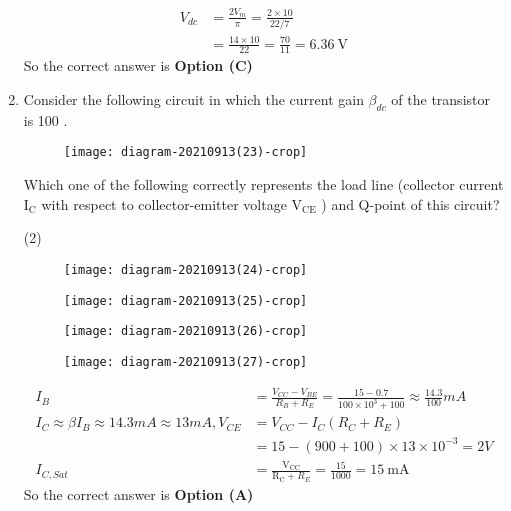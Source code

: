 \begin{enumerate}
\begin{answer}
\begin{align*}
V_{d c}&=\frac{2 V_{m}}{\pi}=\frac{2 \times 10}{22 / 7}\\&=\frac{14 \times 10}{22}=\frac{70}{11}=6.36 \mathrm{~V}
\end{align*}
So the correct answer is \textbf{Option (C)}
\end{answer}
	\item Consider the following circuit in which the current gain $\beta_{d c}$ of the transistor is 100 .\\
	\begin{figure}[H]
		\centering
		\texttt{[image: diagram-20210913(23)-crop]}
	\end{figure}
	Which one of the following correctly represents the load line (collector current $\mathrm{I}_{\mathrm{C}}$ with respect to collector-emitter voltage $\mathrm{V}_{\mathrm{CE}}$ ) and Q-point of this circuit?
\begin{tasks}(2)
\task[\textbf{A.}]\begin{figure}[H]
	\centering
	\texttt{[image: diagram-20210913(24)-crop]}
\end{figure}
\task[\textbf{B.}] \begin{figure}[H]
	\centering
	\texttt{[image: diagram-20210913(25)-crop]}
\end{figure}
\task[\textbf{C.}] \begin{figure}[H]
	\centering
	\texttt{[image: diagram-20210913(26)-crop]}
\end{figure}
\task[\textbf{D.}] \begin{figure}[H]
	\centering
	\texttt{[image: diagram-20210913(27)-crop]}
\end{figure}
\end{tasks}
\begin{answer}
\begin{align*}
I_{B}&=\frac{V_{C C}-V_{B E}}{R_{B}+R_{E}}=\frac{15-0.7}{100 \times 10^{3}+100} \approx \frac{14.3}{100} m A\\
I_{C} \approx \beta I_{B} \approx 14.3 m A \approx 13 m A, V_{C E}&=V_{C C}-I_{C}\left(R_{C}+R_{E}\right)\\&=15-(900+100) \times 13 \times 10^{-3}=2 V\\
I_{C, S a t}&=\frac{\mathrm{V}_{\mathrm{CC}}}{\mathrm{R}_{\mathrm{C}}+R_{E}}=\frac{15}{1000}=15 \mathrm{~mA}
\end{align*}
So the correct answer is \textbf{Option (A)}

\end{answer}
\end{enumerate}
